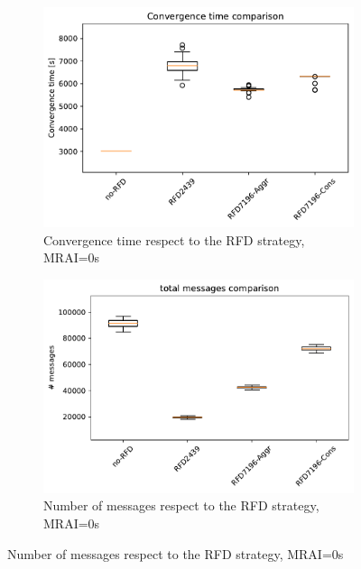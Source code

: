 \begin{figure}[H]
     \centering
     \begin{subfigure}[b]{0.325\textwidth}
         \centering
         \includegraphics[width=\textwidth]{images/RFD/miceVSelephants/MultiMRAI/0/mice/cisco_1000MRAI0_rfd_comparison_time_boxplot.pdf}
         \caption{Convergence time respect to the RFD strategy, MRAI=0s}
         \label{fig:1000_RFD_MRAI30_time_mice}
     \end{subfigure}
     \hfill
     \begin{subfigure}[b]{0.325\textwidth}
         \centering
         \includegraphics[width=\textwidth]{images/RFD/miceVSelephants/MultiMRAI/0/mice/cisco_1000MRAI0_rfd_comparison_messages_boxplot.pdf}
         \caption{Number of messages respect to the RFD strategy, MRAI=0s}
         \label{fig:1000_RFD_MRAI30_messages_mice}

\end{subfigure}
\end{figure}

